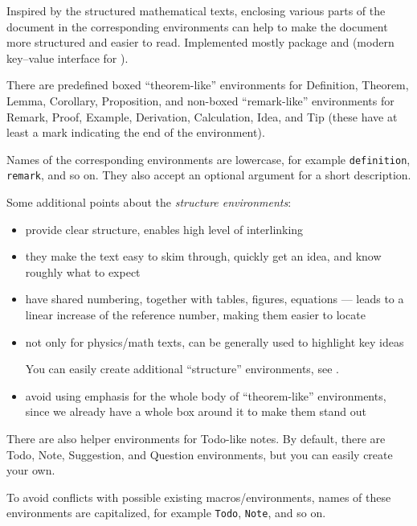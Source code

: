 Inspired by the structured mathematical texts, enclosing various parts of the document in the corresponding environments can help to make the document more structured and easier to read.
Implemented mostly  package and  (modern key--value interface for ).

\begin{remark}
    There are predefined boxed \enquote{theorem-like} environments for \textsf{Definition}, \textsf{Theorem}, \textsf{Lemma}, \textsf{Corollary}, \textsf{Proposition}, and non-boxed \enquote{remark-like} environments for \textsf{Remark}, \textsf{Proof}, \textsf{Example}, \textsf{Derivation}, \textsf{Calculation}, \textsf{Idea}, and \textsf{Tip} (these have at least a mark indicating the end of the environment).

    Names of the corresponding environments are lowercase, for example \texttt{definition}, \texttt{remark}, and so on.
    They also accept an optional argument for a short description.
\end{remark}

Some additional points about the \emph{structure environments}:
\begin{itemize}
    \item provide clear structure, enables high level of interlinking
    \item they make the text easy to skim through, quickly get an idea, and know roughly what to expect
    \item have shared numbering, together with tables, figures, equations --- leads to a linear increase of the reference number, making them easier to locate
    \item not only for physics/math texts, can be generally used to highlight key ideas
          \begin{tip}
              You can easily create additional \enquote{structure} environments, see .
          \end{tip}
    \item avoid using emphasis for the whole body of \enquote{theorem-like} environments, since we already have a whole box around it to make them stand out
\end{itemize}
\vspace{1ex}

\begin{remark}
    There are also helper environments for \textsf{Todo}-like notes.
    By default, there are \textsf{Todo}, \textsf{Note}, \textsf{Suggestion}, and \textsf{Question} environments, but you can easily create your own.

    To avoid conflicts with possible existing macros/environments, names of these environments are capitalized, for example \texttt{Todo}, \texttt{Note}, and so on.
\end{remark}

